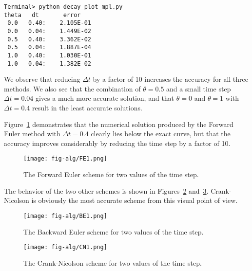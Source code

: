 \documentclass[graybox,sectrefs,envcountresetchap,open=right,final]{svmonodo}
\begin{document}
\begin{Verbatim}[frame=lines,label=\fbox{{\tiny Terminal}},framesep=2.5mm,framerule=0.7pt,fontsize=\fontsize{9pt}{9pt}]
Terminal> python decay_plot_mpl.py
theta   dt       error
 0.0   0.40:    2.105E-01
 0.0   0.04:    1.449E-02
 0.5   0.40:    3.362E-02
 0.5   0.04:    1.887E-04
 1.0   0.40:    1.030E-01
 1.0   0.04:    1.382E-02

\end{Verbatim}

We observe that reducing $\Delta t$ by a factor of 10 increases the
accuracy for all three methods. We also see that
the combination of $\theta=0.5$ and a small time step $\Delta t =0.04$
gives a much more accurate solution, and that $\theta=0$ and $\theta=1$
with $\Delta t = 0.4$ result in the least accurate solutions.

Figure~\ref{decay:fig:FE1} demonstrates that the numerical solution
produced by the Forward Euler method with
$\Delta t=0.4$ clearly lies below the exact curve, but that the
accuracy improves considerably by reducing the time step by a factor
of 10.

\begin{figure}[!ht]  %
  \centerline{\texttt{[image: fig-alg/FE1.png]}}
  \caption{
  The Forward Euler scheme for two values of the time step. \label{decay:fig:FE1}
  }
\end{figure}

The behavior of the two other schemes is shown in Figures~\ref{decay:fig:BE1}
and~\ref{decay:fig:CN1}. Crank-Nicolson is obviously the most accurate
scheme from this visual point of view.

\begin{figure}[!ht]  %
  \centerline{\texttt{[image: fig-alg/BE1.png]}}
  \caption{
  The Backward Euler scheme for two values of the time step. \label{decay:fig:BE1}
  }
\end{figure}

\begin{figure}[!ht]  %
  \centerline{\texttt{[image: fig-alg/CN1.png]}}
  \caption{
  The Crank-Nicolson scheme for two values of the time step. \label{decay:fig:CN1}
  }
\end{figure}

\end{document}
